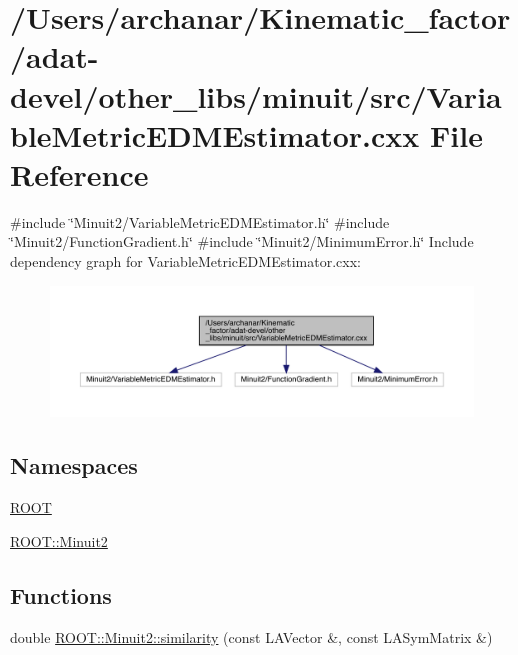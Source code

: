 \hypertarget{adat-devel_2other__libs_2minuit_2src_2VariableMetricEDMEstimator_8cxx}{}\section{/\+Users/archanar/\+Kinematic\+\_\+factor/adat-\/devel/other\+\_\+libs/minuit/src/\+Variable\+Metric\+E\+D\+M\+Estimator.cxx File Reference}
\label{adat-devel_2other__libs_2minuit_2src_2VariableMetricEDMEstimator_8cxx}
{\ttfamily \#include \char`\"{}Minuit2/\+Variable\+Metric\+E\+D\+M\+Estimator.\+h\char`\"{}}\newline
{\ttfamily \#include \char`\"{}Minuit2/\+Function\+Gradient.\+h\char`\"{}}\newline
{\ttfamily \#include \char`\"{}Minuit2/\+Minimum\+Error.\+h\char`\"{}}\newline
Include dependency graph for Variable\+Metric\+E\+D\+M\+Estimator.\+cxx\+:
\nopagebreak
\begin{figure}[H]
\begin{center}
\leavevmode
\includegraphics[width=350pt]{d4/dca/adat-devel_2other__libs_2minuit_2src_2VariableMetricEDMEstimator_8cxx__incl}
\end{center}
\end{figure}
\subsection*{Namespaces}
\begin{DoxyCompactItemize}
\item 
 \mbox{\hyperlink{namespaceROOT}{R\+O\+OT}}
\item 
 \mbox{\hyperlink{namespaceROOT_1_1Minuit2}{R\+O\+O\+T\+::\+Minuit2}}
\end{DoxyCompactItemize}
\subsection*{Functions}
\begin{DoxyCompactItemize}
\item 
double \mbox{\hyperlink{namespaceROOT_1_1Minuit2_aa54e0f1ba5ca00da1b32710322034fee}{R\+O\+O\+T\+::\+Minuit2\+::similarity}} (const L\+A\+Vector \&, const L\+A\+Sym\+Matrix \&)
\end{DoxyCompactItemize}
